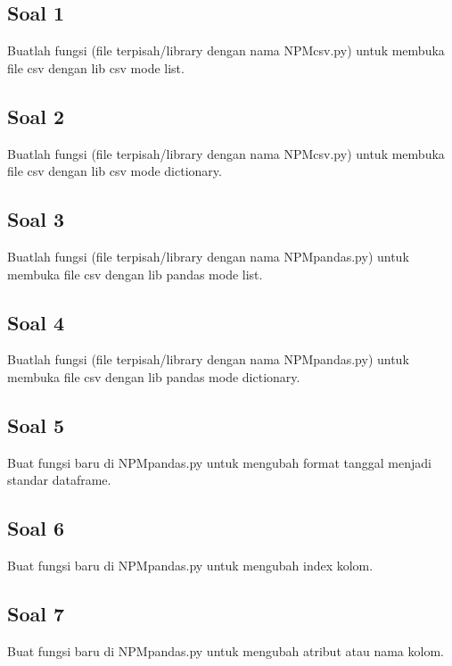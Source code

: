 \subsection{Soal 1}
Buatlah  fungsi  (file  terpisah/library  dengan  nama  NPMcsv.py)  untuk  membuka file csv dengan lib csv mode list.


\subsection{Soal 2}
Buatlah  fungsi  (file  terpisah/library  dengan  nama  NPMcsv.py)  untuk  membuka file csv dengan lib csv mode dictionary.


\subsection{Soal 3}
Buatlah fungsi (file terpisah/library dengan nama NPMpandas.py) untuk membuka file csv dengan lib pandas mode list.


\subsection{Soal 4}
Buatlah fungsi (file terpisah/library dengan nama NPMpandas.py) untuk membuka file csv dengan lib pandas mode dictionary.


\subsection{Soal 5}
Buat fungsi baru di NPMpandas.py untuk mengubah format tanggal menjadi standar dataframe.


\subsection{Soal 6}
Buat fungsi baru di NPMpandas.py untuk mengubah index kolom.


\subsection{Soal 7}
Buat fungsi baru di NPMpandas.py untuk mengubah atribut atau nama kolom.


